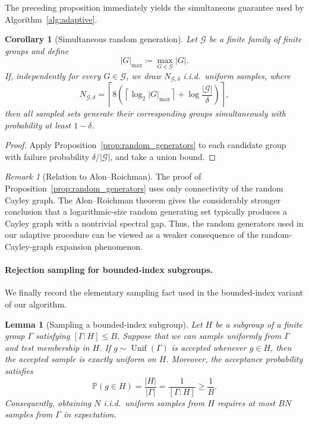 \documentclass[11pt]{article}
\theoremstyle{plain}
\newtheorem{lemma}[theorem]{Lemma}
\newtheorem{corollary}[theorem]{Corollary}
\theoremstyle{definition}
\theoremstyle{remark}
\newtheorem{remark}[theorem]{Remark}
\begin{document}
The preceding proposition immediately yields the simultaneous guarantee used
by Algorithm~\ref{alg:adaptive}.

\begin{corollary}[Simultaneous random generation]
\label{cor:simultaneous_generators}
Let \(\mathcal G\) be a finite family of finite groups and define
\[
|G|_{\max}
\coloneqq
\max_{G\in\mathcal G}|G|.
\]
If, independently for every \(G\in\mathcal G\), we draw
\(N_{\mathcal G,\delta}\) i.i.d.\ uniform samples, where
\[
N_{\mathcal G,\delta}
=
\left\lceil
8\left(
\left\lceil\log_2|G|_{\max}\right\rceil
+
\log\frac{|\mathcal G|}{\delta}
\right)
\right\rceil,
\]
then all sampled sets generate their corresponding groups simultaneously with
probability at least \(1-\delta\).
\end{corollary}

\begin{proof}
Apply Proposition~\ref{prop:random_generators} to each candidate group with failure
probability \(\delta/|\mathcal G|\), and take a union bound.
\end{proof}

\begin{remark}[Relation to Alon--Roichman]
The proof of Proposition~\ref{prop:random_generators} uses only connectivity of the
random Cayley graph. The Alon--Roichman theorem gives the considerably
stronger conclusion that a logarithmic-size random generating set typically
produces a Cayley graph with a nontrivial spectral gap. Thus, the random
generators used in our adaptive procedure can be viewed as a weaker
consequence of the random-Cayley-graph expansion phenomenon.
\end{remark}


\paragraph{Rejection sampling for bounded-index subgroups.}
We finally record the elementary sampling fact used in the bounded-index
variant of our algorithm.

\begin{lemma}[Sampling a bounded-index subgroup]
\label{lem:rejection_sampling}
Let \(H\) be a subgroup of a finite group \(\Gamma\) satisfying
\([\Gamma:H]\le B\). Suppose that we can sample uniformly from \(\Gamma\)
and test membership in \(H\). If
\(g\sim\operatorname{Unif}(\Gamma)\) is accepted whenever \(g\in H\), then
the accepted sample is exactly uniform on \(H\). Moreover, the acceptance
probability satisfies
\[
\mathbb P(g\in H)
=
\frac{|H|}{|\Gamma|}
=
\frac{1}{[\Gamma:H]}
\ge\frac{1}{B}.
\]
Consequently, obtaining \(N\) i.i.d.\ uniform samples from \(H\) requires at
most \(BN\) samples from \(\Gamma\) in expectation.
\end{lemma}
\end{document}
